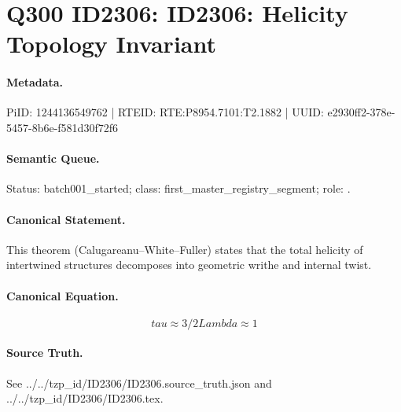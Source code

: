 \section*{Q300 ID2306: ID2306: Helicity Topology Invariant}
\paragraph{Metadata.}
PiID: 1244136549762 | RTEID: RTE:P8954.7101:T2.1882 | UUID: e2930ff2-378e-5457-8b6e-f581d30f72f6

\paragraph{Semantic Queue.}
Status: batch001\_started; class: first\_master\_registry\_segment; role: .

\paragraph{Canonical Statement.}
This theorem (Calugareanu--White--Fuller) states that the total helicity of intertwined structures decomposes into geometric writhe and internal twist.

\paragraph{Canonical Equation.}
\[
tau \approx 3/2 Lambda \approx 1
\]

\paragraph{Source Truth.}
See ../../tzp\_id/ID2306/ID2306.source\_truth.json and ../../tzp\_id/ID2306/ID2306.tex.
